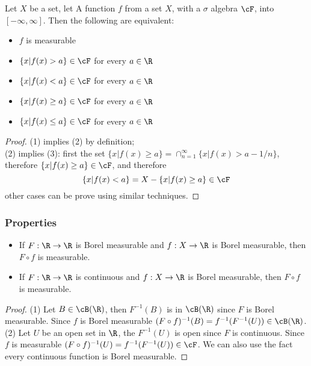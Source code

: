 \begin{refsection}
\begin{theorem}
\cite[361]{johnsonbaugh2010foundations}Let $X$ be a set, let A function $f$ from a set $X$, with a $\sigma$ algebra $\cF$, into $[-\infty,\infty]$. Then the following are equivalent:
\begin{itemize}
    \item $f$ is measurable
    \item $\{x|f(x) > a\} \in \cF$ for every $a\in \R$
    \item $\{x|f(x) < a\} \in \cF$ for every $a\in \R$
    \item $\{x|f(x) \geq a\} \in \cF$ for every $a\in \R$
    \item $\{x|f(x) \leq a\} \in \cF$ for every $a\in \R$
\end{itemize}
\end{theorem}
\begin{proof}
(1) implies (2) by definition;\\
(2) implies (3): first the set $\{x|f(x) \geq a\} = \cap_{n=1}^\infty \{x|f(x) > a-1/n\}$, therefore $\{x|f(x) \geq a\} \in \cF$, and therefore $$\{x|f(x) < a\} = X-\{x|f(x) \geq a\} \in \cF$$
other cases can be prove using similar techniques. 	
\end{proof}



\begin{lemma}
	
\end{lemma}


\subsubsection{Properties}

\begin{lemma}
	\cite[362]{johnsonbaugh2010foundations}\label{ch:calculus:th:continuityPreservesBorelMeasurability} 
\begin{itemize}
	\item If $F:\R\to\R$ is Borel measurable and $f:X\to \R$ is Borel measurable, then $F\circ f$ is measurable.
	\item 	If $F:\R\to\R$ is continuous and $f:X\to \R$ is Borel measurable, then $F\circ f$ is measurable.
\end{itemize}	
\end{lemma}
\begin{proof}
(1) Let $B\in \cB(\R)$, then $F^{-1}(B)$ is in $\cB(\R)$ since $F$ is Borel measurable. Since $f$ is Borel measurable $(F\circ f)^{-1}(B) = f^{-1}(F^{-1}(U)) \in \cB(\R)$.
(2)	
	Let $U$ be an open set in $\R$, the $F^{-1}(U)$ is open since $F$ is continuous. Since $f$ is measurable $(F\circ f)^{-1}(U) = f^{-1}(F^{-1}(U)) \in \cF$. We can also use the fact every continuous function is Borel measurable.	
\end{proof}


\end{refsection}
